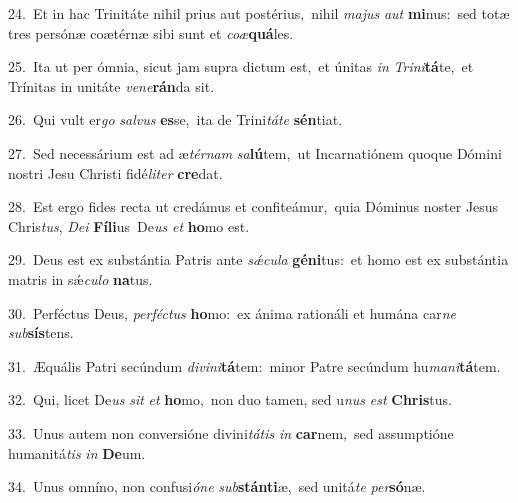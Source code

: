 {\numbfont\textcolor{\numbcolor}{24.}}~Et in hac Trinitáte nihil prius aut postérius,~\dagger nihil \textit{ma}\-\textit{jus} \textit{aut} \textbf{mi}\-nus:~\star sed totæ tres persónæ coætérnæ sibi sunt et \textit{co}\-\textit{æ}\textbf{quá}les.\par
{\numbfont\textcolor{\numbcolor}{25.}}~Ita ut per ómnia, sicut jam supra dictum est,~\dagger et únitas \textit{in} \textit{Tri}\-\textit{ni}\textbf{tá}te,~\star et Trínitas in unitáte \textit{ve}\-\textit{ne}\textbf{rán}da sit.\par
{\numbfont\textcolor{\numbcolor}{26.}}~Qui vult er\textit{go} \textit{sal}\-\textit{vus} \textbf{es}\-se,~\star ita de Trini\-\textit{tá}\-\textit{te} \textbf{sén}\-tiat.\par
{\numbfont\textcolor{\numbcolor}{27.}}~Sed necessárium est ad æ\-\textit{tér}\-\textit{nam} \textit{sa}\-\textbf{lú}tem,~\star ut Incarnatiónem quoque Dómini nostri Jesu Christi fidé\-\textit{li}\-\textit{ter} \textbf{cre}\-dat.\par
{\numbfont\textcolor{\numbcolor}{28.}}~Est ergo fides recta ut credámus et confiteámur,~\dagger quia Dóminus noster Jesus Chris\-\textit{tus}\-, \textit{De}\-\textit{i} \textbf{Fí}\-\textbf{li}us~\star De\textit{us} \textit{et} \textbf{ho}\-mo est.\par
{\numbfont\textcolor{\numbcolor}{29.}}~Deus est ex substántia Patris ante \textit{sǽ}\-\textit{cu}\textit{la} \textbf{gé}\-\textbf{ni}tus:~\star et homo est ex substántia matris in sǽ\-\textit{cu}\-\textit{lo} \textbf{na}\-tus.\par
{\numbfont\textcolor{\numbcolor}{30.}}~Perféctus Deus, \textit{per}\-\textit{féc}\textit{tus} \textbf{ho}\-mo:~\star ex ánima rationáli et humána car\textit{ne} \textit{sub}\-\textbf{sís}tens.\par
{\numbfont\textcolor{\numbcolor}{31.}}~Æquális Patri secúndum \textit{di}\-\textit{vi}\textit{ni}\textbf{tá}tem:~\star minor Patre secúndum hu\-\textit{ma}\-\textit{ni}\textbf{tá}tem.\par
{\numbfont\textcolor{\numbcolor}{32.}}~Qui, licet De\textit{us} \textit{sit} \textit{et} \textbf{ho}\-mo,~\star non duo tamen, sed u\textit{nus} \textit{est} \textbf{Chris}\-tus.\par
{\numbfont\textcolor{\numbcolor}{33.}}~Unus autem non conversióne divini\-\textit{tá}\-\textit{tis} \textit{in} \textbf{car}\-nem,~\star sed assumptióne humanitá\textit{tis} \textit{in} \textbf{De}\-um.\par
{\numbfont\textcolor{\numbcolor}{34.}}~Unus omníno, non confusi\-\textit{ó}\-\textit{ne} \textit{sub}\-\textbf{stán}\textbf{ti}æ,~\star sed unitá\textit{te} \textit{per}\-\textbf{só}næ.\par
